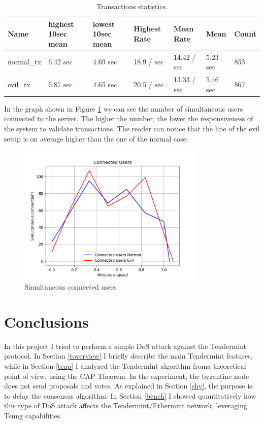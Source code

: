 \documentclass[]{article}
\begin{document}
\begin{table}[!htb]
\centering
\begin{tabular}{| l | l | l | l | l | l | l |}
	 \hline
	Name  & highest 10sec mean  & lowest 10sec mean & Highest Rate & Mean Rate & Mean  & Count \\
	 \hline
	 normal\_tx  & 6.42 sec  & 4.69 sec  & 18.9 / sec  & 14.42 / sec  & 5.23 sec  & 853 \\	
	 \hline
	 evil\_tx  & 6.87 sec  & 4.65 sec  & 20.5 / sec  & 13.33 / sec  & 5.46 sec  & 867  \\
	 \hline

	\hline
\end{tabular}
\caption{\label{bench-main} Transactions statistics.}
\end{table}
In the graph shown in Figure \ref{simultaneous_users} we can see the number of simultaneous users connected to the server. The higher the number, the lower the responsiveness of the system to validate transactions. The reader can notice that the line of the evil setup is on average higher than the one of the normal case.
\begin{figure}[h]
	\centering
	\includegraphics[width=0.8\textwidth]{simultaneous_users}
	\caption{\label{simultaneous_users} Simultaneous connected users}
\end{figure}

\section{Conclusions}
In this project I tried to perform a simple DoS attack against the Tendermint protocol. In Section \ref{toverview} I briefly describe the main Tendermint features, while in Section \ref{tcap} I analyzed the Tendermint algorithm froma theoretical point of view, using the CAP Theorem. In the experiment, the byzantine node does not send proposals and votes. As explained in Section \ref{shy}, the purpose is to delay the consensus algorithm. In Section \ref{bench} I showed quantitatively how this type of DoS attack affects the Tendermint/Ethermint network, leveraging Tsung capabilities.


	
\end{document}
